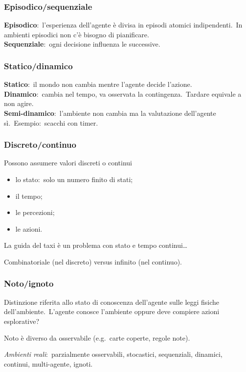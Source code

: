 \subsubsection{Episodico/sequenziale}
\textbf{Episodico}:\ l'esperienza dell'agente è divisa in episodi atomici indipendenti.\
In ambienti episodici non c'è bisogno di pianificare.\\
\textbf{Sequenziale}:\ ogni decisione influenza le successive.

\subsubsection{Statico/dinamico}

\textbf{Statico}:\ il mondo non cambia mentre l'agente decide l'azione.\\
\textbf{Dinamico}:\ cambia nel tempo, va osservata la contingenza.\
Tardare equivale a non agire.\\
\textbf{Semi-dinamico}:\ l'ambiente non cambia ma la valutazione dell'agente sì.\
Esempio:\ scacchi con timer.

\subsubsection{Discreto/continuo}

Possono assumere valori discreti o continui
\begin{itemize}
	\item lo stato:\ solo un numero finito di stati;
	\item il tempo;
	\item le percezioni;
	\item le azioni.
\end{itemize}
La guida del taxi è un problema con stato e tempo continui\dots

Combinatoriale (nel discreto) versus infinito (nel continuo).

\subsubsection{Noto/ignoto}
Distinzione riferita allo stato di conoscenza dell'agente sulle leggi fisiche dell'ambiente.\
L'agente conosce l'ambiente oppure deve compiere azioni esplorative?

Noto è diverso da osservabile (e.g.\ carte coperte, regole note).

\textit{Ambienti reali}:\ parzialmente osservabili, stocastici, sequenziali, dinamici, continui, multi-agente, ignoti.

